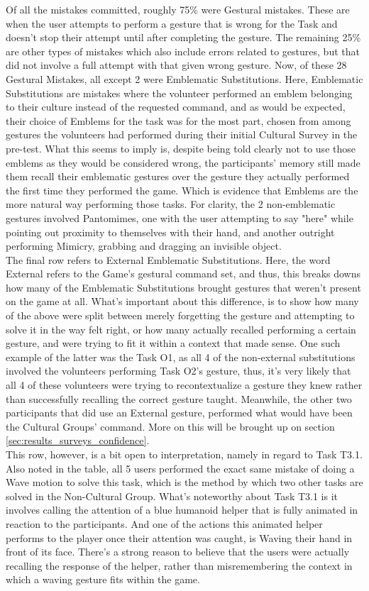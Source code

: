     Of all the mistakes committed, roughly 75\% were Gestural mistakes. These are when the user attempts to perform a gesture that is wrong for the Task and doesn't stop their attempt until after completing the gesture. The remaining 25\% are other types of mistakes which also include errors related to gestures, but that did not involve a full attempt with that given wrong gesture. Now, of these 28 Gestural Mistakes, all except 2 were Emblematic Substitutions. Here, Emblematic Substitutions are mistakes where the volunteer performed an emblem belonging to their culture instead of the requested command, and as would be expected, their choice of Emblems for the task was for the most part, chosen from among gestures the volunteers had performed during their initial Cultural Survey in the pre-test. What this seems to imply is, despite being told clearly not to use those emblems as they would be considered wrong, the participants' memory still made them recall their emblematic gestures over the gesture they actually performed the first time they performed the game. Which is evidence that Emblems are the more natural way performing those tasks. For clarity, the 2 non-emblematic gestures involved Pantomimes, one with the user attempting to say "here" while pointing out proximity to themselves with their hand, and another outright performing Mimicry, grabbing and dragging an invisible object.\\
    The final row refers to External Emblematic Substitutions. Here, the word External refers to the Game's gestural command set, and thus, this breaks downs how many of the Emblematic Substitutions brought gestures that weren't present on the game at all. What's important about this difference, is to show how many of the above were split between merely forgetting the gesture and attempting to solve it in the way felt right, or how many actually recalled performing a certain gesture, and were trying to fit it within a context that made sense. One such example of the latter was the Task O1, as all 4 of the non-external substitutions involved the volunteers performing Task O2's gesture, thus, it's very likely that all 4 of these volunteers were trying to recontextualize a gesture they knew rather than successfully recalling the correct gesture taught. Meanwhile, the other two participants that did use an External gesture, performed what would have been the Cultural Groups' command. More on this will be brought up on section \ref{sec:results_surveys_confidence}.\\ 
    This row, however, is a bit open to interpretation, namely in regard to Task T3.1. Also noted in the table, all 5 users performed the exact same mistake of doing a Wave motion to solve this task, which is the method by which two other tasks are solved in the Non-Cultural Group. What's noteworthy about Task T3.1 is it involves calling the attention of a blue humanoid helper that is fully animated in reaction to the participants. And one of the actions this animated helper performs to the player once their attention was caught, is Waving their hand in front of its face. There's a strong reason to believe that the users were actually recalling the response of the helper, rather than misremembering the context in which a waving gesture fits within the game.\\
